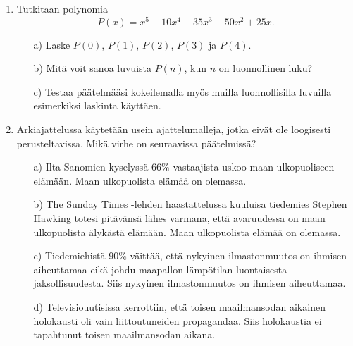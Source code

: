 \begin{enumerate}
 

\item Tutkitaan polynomia
\[
P(x) = x^5 -10x^4+35x^3 -50 x^2 +25x.
\]
\begin{itemize}
\item[a)]
Laske $P(0)$, $P(1)$, $P(2)$, $P(3)$ ja $P(4)$. 
\item[b)] Mitä voit sanoa luvuista $P(n)$, kun $n$ on luonnollinen luku?
\item[c)] Testaa päätelmääsi kokeilemalla myös muilla luonnollisilla luvuilla esimerkiksi laskinta käyttäen.
\end{itemize}

\item 
Arkiajattelussa käytetään usein ajattelumalleja, jotka eivät ole loogisesti perusteltavissa. Mikä virhe on seuraavissa päätelmissä?
\begin{itemize}
\item[a)] Ilta Sanomien kyselyssä $66\%$ vastaajista uskoo maan ulkopuoliseen elämään. Maan ulkopuolista elämää on olemassa.
\item[b)] The Sunday Times -lehden haastattelussa kuuluisa tiedemies Stephen Hawking totesi pitävänsä lähes varmana, että avaruudessa on maan ulkopuolista älykästä elämään. Maan ulkopuolista elämää on olemassa.
\item[c)]
Tiedemiehistä 90\% väittää, että nykyinen ilmastonmuutos on ihmisen aiheuttamaa eikä johdu maapallon lämpötilan luontaisesta jaksollisuudesta. Siis nykyinen ilmastonmuutos on ihmisen aiheuttamaa.
\item[d)]
Televisiouutisissa kerrottiin, että toisen maailmansodan aikainen holokausti oli vain liittoutuneiden propagandaa. Siis holokaustia ei tapahtunut toisen maailmansodan aikana.
\end{itemize}


\end{enumerate}
